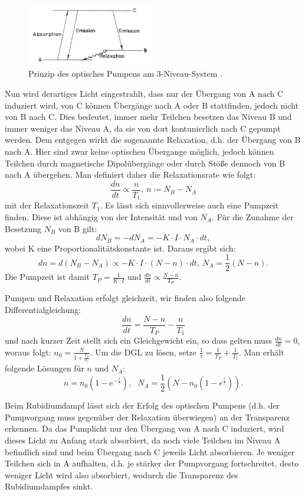 \documentclass[bigchapter,colorback,accentcolor=tud4b,linedtoc,11pt]{tudreport}
\begin{document}
\begin{figure}[H] 
  \centering
     \includegraphics[width=0.5\textwidth]{img/Pumpen.jpg}
     \caption{Prinzip des optisches Pumpens am 3-Niveau-System \cite{Anleitung}.}
\end{figure}

Nun wird derartiges Licht eingestrahlt, dass nur der Übergang von A nach C induziert wird, von C können Übergänge nach A oder B stattfinden, jedoch nicht von B nach C. Dies bedeutet, immer mehr Teilchen besetzen das Niveau B und immer weniger das Niveau A, da sie von dort kontunierlich nach C gepumpt werden. Dem entgegen wirkt die sogenannte Relaxation, d.h. der Übergang von B nach A. Hier sind zwar keine optischen Übergange möglich, jedoch können Teilchen durch magnetische Dipolübergänge oder durch Stöße dennoch von B nach A übergehen. Man definiert daher die Relaxationsrate wie folgt: 
$$\frac{d n}{d t} \propto \frac{n}{T_1},~ n \coloneqq N_B-N_A$$
mit der Relaxationszeit $T_1$. Es lässt sich sinnvollerweise auch eine Pumpzeit finden. Diese ist abhängig von der Intensität und von $N_A$. Für die Zunahme der Besetzung $N_B$ von B gilt:
$$d N_B = - d N_A = -K \cdot I \cdot N_A \cdot d t,$$
wobei K eine Proportionalitätskonstante ist. Daraus ergibt sich:
$$d n = d (N_B-N_A) \propto -K \cdot I \cdot (N-n) \cdot d t,~ N_A = \frac{1}{2} (N-n).$$ 
Die Pumpzeit ist damit $T_P = \frac{1}{K \cdot I}$ und $\frac{d n}{d t} \propto \frac{N-n}{T_P}$.

Pumpen und Relaxation erfolgt gleichzeit, wir finden also folgende Differentialgleichung:
$$\frac{d n}{d t} = \frac{N-n}{T_P} - \frac{n}{T_1}$$
und nach kurzer Zeit stellt sich ein Gleichgewicht ein, so dass gelten muss $\frac{d n}{d t} = 0$, woraus folgt: $n_0 = \frac{N}{1+\frac{T_P}{T_1}}$. Um die DGL zu lösen, setze $\frac{1}{\tau} = \frac{1}{T_P} + \frac{1}{T_1}$. Man erhält folgende Lösungen für $n$ und $N_A$:
$$n = n_0 (1-e^{-\frac{t}{\tau}}),~~~ N_A = \frac{1}{2} (N-n_0 (1-e^{\frac{t}{\tau}})).$$

Beim Rubidiumdampf lässt sich der Erfolg des optischen Pumpens (d.h. der Pumpvorgang muss gegenüber der Relaxation überwiegen) an der Transparenz erkennen. Da das Pumplicht nur den Übergang von A nach C induziert, wird dieses Licht zu Anfang stark absorbiert, da noch viele Teilchen im Niveau A befindlich sind und beim Übergang nach C jeweils Licht absorbieren. Je weniger Teilchen sich in A aufhalten, d.h. je stärker der Pumpvorgang fortschreitet, desto weniger Licht wird also absorbiert, wodurch die Transparenz des Rubidiumdampfes sinkt. 
\end{document}
